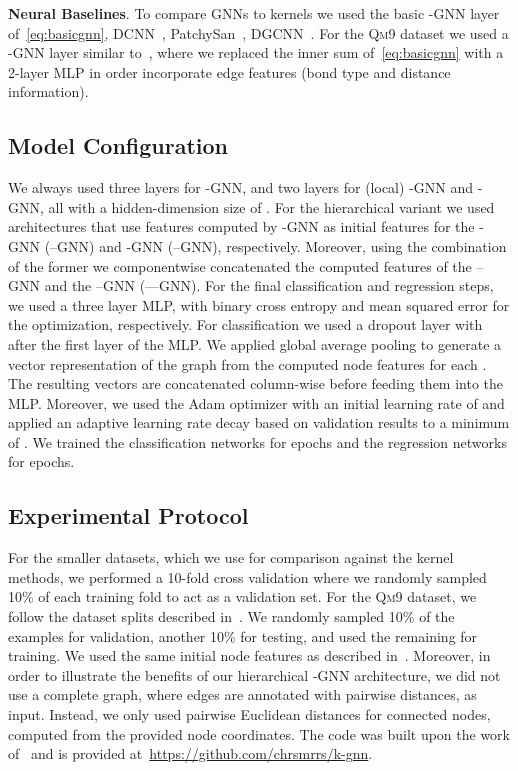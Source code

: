 \documentclass[letterpaper]{article}
\theoremstyle{definition}
\newcommand{\xhdr}[1]{{\noindent\bfseries #1}.}
\begin{document}
\xhdr{Neural Baselines} To compare GNNs to kernels we used the basic -GNN layer of~\cref{eq:basicgnn}, DCNN~\cite{Wang2018}, PatchySan~\cite{Nie+2016}, DGCNN~\cite{Zha+2018}. For the \textsc{Qm9} dataset we used a -GNN layer similar to~\cite{Gil+2017}, where we replaced the inner sum of~\cref{eq:basicgnn} with a 2-layer MLP in order incorporate edge features (bond type and distance information).

\subsection{Model Configuration}

We always used three layers for -GNN, and two layers for (local) -GNN and -GNN, all with a hidden-dimension size of . 
For the hierarchical variant we used architectures that use features computed by -GNN as initial features for the -GNN (--GNN)  and -GNN (--GNN), respectively. 
Moreover, using the combination of the former we componentwise concatenated the computed features of the --GNN and the --GNN (---GNN).
For the final classification and regression steps, we used a three layer MLP, with binary cross entropy and mean squared error for the optimization, respectively.
For classification we used a dropout layer with  after the first layer of the MLP. 
We applied global average pooling to generate a vector representation of the graph from the computed node features for each . 
The resulting vectors are concatenated column-wise before feeding them into the MLP. 
Moreover, we used the Adam optimizer with an initial learning rate of  and applied an adaptive learning rate decay based on validation results to a minimum of .  We trained the classification networks for  epochs and the regression networks for  epochs.

\subsection{Experimental Protocol} 

For the smaller datasets, which we use for comparison against the kernel methods, we performed a 10-fold cross validation where we randomly sampled 10\% of each training fold to act as a validation set.
For the \textsc{Qm9} dataset, we follow the dataset splits described in~\cite{Wu+2018}.
We randomly sampled 10\% of the examples for validation, another 10\% for testing, and used the remaining for training. We used the same initial node features as described in~\cite{Gil+2017}. Moreover, in order to illustrate the benefits of our hierarchical -GNN architecture, we did not use a complete graph, where edges are annotated with pairwise distances, as input.
Instead, we only used pairwise Euclidean distances for connected nodes, computed from the provided node coordinates. The code was built upon the work of~\cite{Fey+2018} and is provided at~\url{https://github.com/chrsmrrs/k-gnn}.
\end{document}
